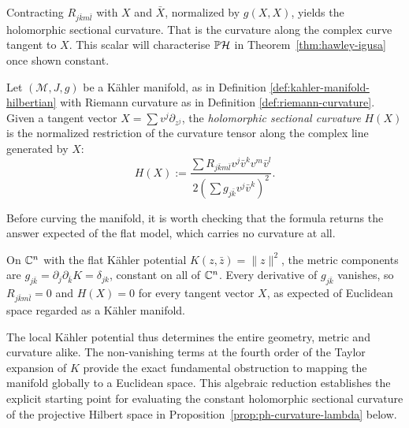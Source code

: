 \noindent Contracting \(R_{j\bar{k}m\bar{l}}\) with \(X\) and \(\bar{X}\), normalized by \(g(X,X)\), yields the holomorphic sectional curvature. That is the curvature along the complex curve tangent to \(X\). This scalar will characterise \(\PH\) in Theorem~\ref{thm:hawley-igusa} once shown constant.

\begin{definition}\label{def:holomorphic-curvature}
	Let $(\mathcal{M}, J, g)$ be a Kähler manifold, as in Definition \ref{def:kahler-manifold-hilbertian} with Riemann curvature as in Definition \ref{def:riemann-curvature}.  Given a tangent vector $X = \sum v^j \partial_{z^j}$, the \emph{holomorphic sectional curvature} $H(X)$ is the normalized restriction of the curvature tensor along the complex line generated by $X$:
	\begin{equation}
	H(X) := \frac{\sum R_{j\bar{k}m\bar{l}} v^j \bar{v}^k v^m \bar{v}^l}{2 \left( \sum g_{j\bar{k}} v^j \bar{v}^k \right)^2}.\label{eq:sec-curv}
	\end{equation}
\end{definition}

\noindent Before curving the manifold, it is worth checking that the formula returns the answer expected of the flat model, which carries no curvature at all.

\begin{example}
	\label{ex:flat-space-curvature}
	On $\mathbb{C}^n$ with the flat Kähler potential $K(z,\bar z)=\|z\|^2$, the
	metric components are $g_{j\bar{k}}=\partial_j\partial_{\bar{k}}K=\delta_{jk}$,
	constant on all of $\mathbb{C}^n$. Every derivative of $g_{j\bar{k}}$
	vanishes, so $R_{j\bar{k}m\bar{l}}=0$ and $H(X)=0$ for
	every tangent vector $X$, as expected of Euclidean space regarded as
	a Kähler manifold.
\end{example}

The local Kähler potential thus determines the entire geometry, metric and curvature alike. The non-vanishing terms at the fourth order of the Taylor expansion of $K$ provide the exact fundamental obstruction to mapping the manifold globally to a Euclidean space. This algebraic reduction establishes the explicit starting point for evaluating the constant holomorphic sectional curvature of the projective Hilbert space in Proposition~\ref{prop:ph-curvature-lambda} below.

